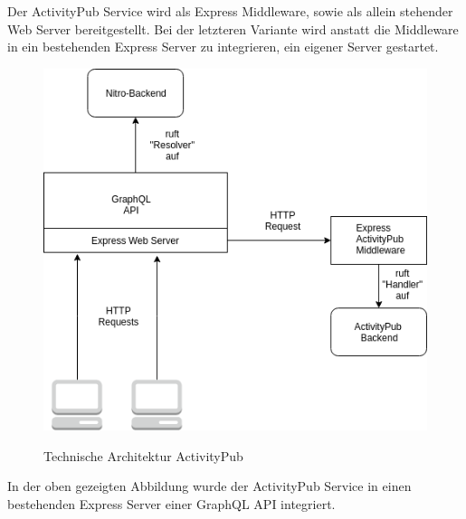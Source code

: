 	Der ActivityPub Service wird als Express Middleware, sowie als allein stehender Web Server bereitgestellt. Bei der letzteren Variante wird anstatt die Middleware in ein bestehenden Express Server zu integrieren, ein eigener  Server gestartet.\\
	\begin{figure}[h]
		\centering
		\includegraphics[scale=0.6]{figures/technische-architektur-activitypub.png}
		\label{technische-architektur-activitypub}
		\caption{Technische Architektur ActivityPub}
	\end{figure}
	In der oben gezeigten Abbildung wurde der ActivityPub Service in einen bestehenden Express Server einer GraphQL API integriert.\\
	
